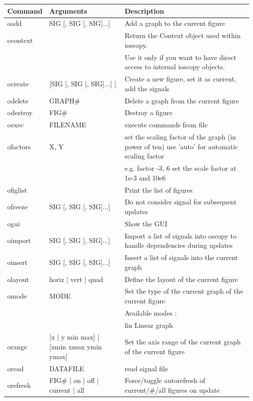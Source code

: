 \documentclass[a4paper,11pt]{article}
\begin{document}
\begin{landscape}
  \begin{table}[htbp]
    \centering\sf
    \begin{tabular}{lll}
      \hline
      Command & Arguments & Description \\
      \hline
      oadd & SIG [, SIG [, SIG]...] &Add a graph to the current figure\\
      ocontext& & Return the Context object used within ioscopy.\\
      & &Use it only if you want to have direct access to internal ioscopy objects.\\
      ocreate & [SIG [, SIG [, SIG]...] ]&Create a new figure, set it as current, add the signals\\
      odelete & GRAPH\# &Delete a graph from the current figure\\
      odestroy & FIG\# &Destroy a figure\\
      oexec & FILENAME &execute commands from file\\
      ofactors & X, Y &set the scaling factor of the graph (in power of ten)   use 'auto' for automatic scaling factor\\
      & & e.g. factor -3, 6 set the scale factor at 1e-3 and 10e6\\
      ofiglist & &Print the list of figures\\
      ofreeze & SIG [, SIG [, SIG]...] &Do not consider signal for subsequent updates\\
      ogui & & Show the GUI\\
      oimport& SIG [, SIG [, SIG]...] & Import a list of signals into oscopy to handle dependencies during updates\\
      oinsert & SIG [, SIG [, SIG]...] &Insert a list of signals into the current graph\\
      olayout & horiz | vert | quad&Define the layout of the current figure\\
      omode & MODE &Set the type of the current graph of the current figure\\
      & &Available modes :\\
      & & lin      Linear graph\\
      orange & [x | y min max] | [xmin xmax ymin ymax] &Set the axis range of the current graph of the current figure\\
      oread & DATAFILE &read signal file\\
      orefresh &  FIG\# | on | off | current | all& Force/toggle autorefresh of current/\#/all figures on update\\

\end{tabular}
\end{table}
\end{landscape}
\end{document}
